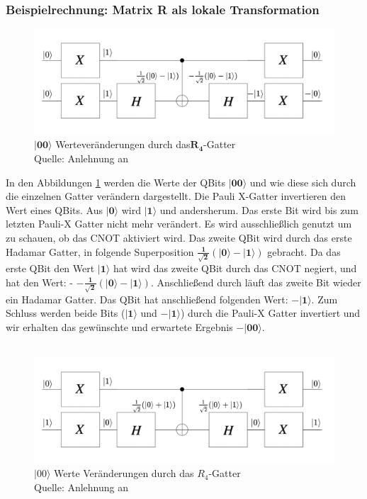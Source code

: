 \subsubsection{Beispielrechnung: Matrix R als lokale Transformation}
 \begin{figure}[hbtp]
	\centering
	\includegraphics[width=.8\textwidth]{figures/RGatter00.png}
	\caption{$\mathbf{|00\rangle}$ Werteveränderungen durch das$\mathbf{R_4}$-Gatter \\ Quelle: Anlehnung an \cite[S. 145]{Ho17}}
	\label{fig:Rgatter00}
\end{figure}
 In den Abbildungen \ref{fig:Rgatter00} werden die Werte der QBits $\mathbf{|00\rangle}$ und wie diese sich durch die einzelnen Gatter verändern dargestellt.
 Die Pauli X-Gatter invertieren den Wert eines QBits. Aus $\mathbf{|0\rangle}$ wird $\mathbf{|1\rangle}$ und andersherum. Das erste Bit wird bis zum letzten Pauli-X Gatter nicht mehr verändert. Es wird ausschließlich genutzt um zu schauen, ob das CNOT aktiviert wird. Das zweite QBit wird durch das erste Hadamar Gatter, in folgende Superposition $\mathbf{\frac{1}{\sqrt 2}(|0\rangle - |1\rangle)}$ gebracht. Da das erste QBit den Wert $\mathbf{|1\rangle}$ hat wird das zweite QBit durch das CNOT negiert, und hat den Wert: - $\mathbf{-\frac{1}{\sqrt 2}(|0\rangle - |1\rangle)}$. Anschließend durch läuft das zweite Bit wieder ein Hadamar Gatter. Das QBit hat anschließend folgenden Wert: $\mathbf{-|1\rangle}$.
 Zum Schluss werden beide Bits ($\mathbf{|1\rangle}$ und $\mathbf{-|1\rangle}$) durch die Pauli-X Gatter invertiert und wir erhalten das gewünschte und erwartete Ergebnis $\mathbf{-|00\rangle}$.
  \\
  \\
   \begin{figure}[hbtp]
  	\centering
  	\includegraphics[width=.8\textwidth]{figures/RGatter01.png}
  	\caption{$|00\rangle$ Werte Veränderungen durch das $R_4$-Gatter \\ Quelle: Anlehnung an \cite[S. 145]{Ho17}}
  	\label{fig:Rgatter01}
  \end{figure}
